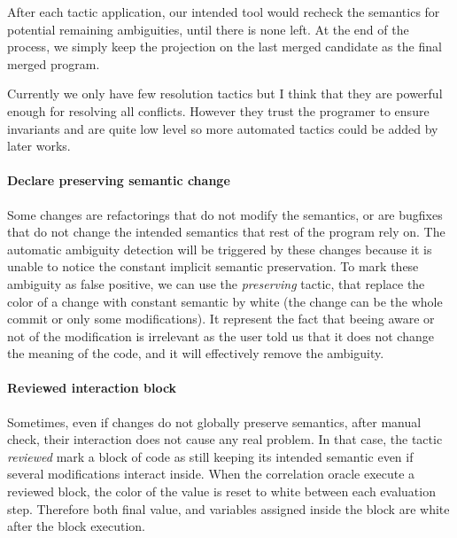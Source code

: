 \documentclass[a4paper,11pt]{article}
\newcommand\rtstate[3]{\langle #1, #2, #3\rangle}
\begin{document}
After each tactic application, our intended tool would recheck the semantics for potential remaining ambiguities, until there is none left. At the end of the process, we  simply keep the projection on the last merged candidate as the final merged program.

Currently we only have few resolution tactics but I think that they are powerful enough for resolving all conflicts. However they trust the programer to ensure invariants and are quite low level so more automated tactics could be added by later works.

\paragraph{Declare preserving semantic change} Some changes are refactorings that do not modify the semantics, or are bugfixes that do not change the intended semantics that rest of the program rely on.
The automatic ambiguity detection will be triggered by these changes because it is unable to notice the constant implicit semantic preservation. To mark these ambiguity as false positive, we can use the \textit{preserving} tactic, that replace the color of a change with constant semantic by white (the change can be the whole commit or only some modifications). It represent the fact that beeing aware or not of the modification is irrelevant as the user told us that it does not change the meaning of the code, and it will effectively remove the ambiguity.

\paragraph{Reviewed interaction block} Sometimes, even if changes do not globally preserve semantics, after manual check, their interaction does not cause any real problem. In that case, the tactic \textit{reviewed} mark a block of code as still keeping its intended semantic even if several modifications interact inside. When the correlation oracle execute a reviewed block, the color of the value is reset to white between each evaluation step. Therefore both final value, and variables assigned inside the block are white after the block execution.
\end{document}
